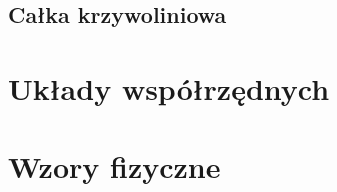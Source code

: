 \documentclass[11pt]{scrartcl}
\begin{document}
        \subsection{Całka krzywoliniowa}
        


    \appendix

    \section{Układy współrzędnych} \label{s:coordinate systems}
    

    \section{Wzory fizyczne} \label{s:physics formulas}
    
\end{document}
